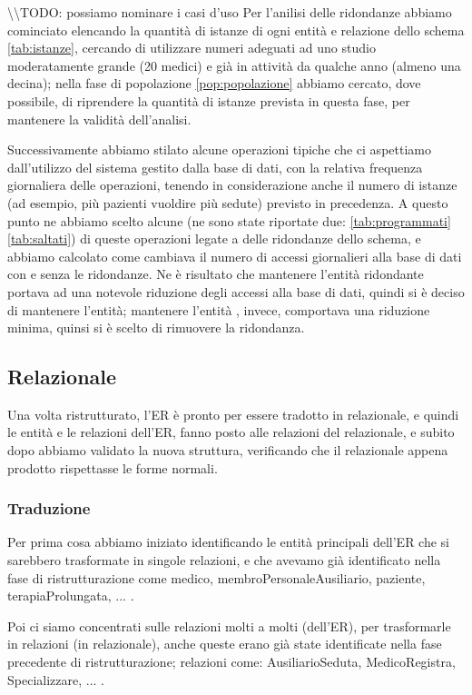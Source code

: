 \documentclass[11pt]{article}
\begin{document}
\textbackslash\textbackslash TODO: possiamo nominare i casi d'uso
Per l'anilisi delle ridondanze abbiamo cominciato elencando la quantità di istanze di ogni entità e relazione dello schema \ref{tab:istanze}, cercando di utilizzare numeri adeguati ad uno studio moderatamente grande (20 medici) e già in attività da qualche anno (almeno una decina); nella fase di popolazione \ref{pop:popolazione} abbiamo cercato, dove possibile, di riprendere la quantità di istanze prevista in questa fase, per mantenere la validità dell'analisi.

Successivamente abbiamo stilato alcune operazioni tipiche che ci aspettiamo dall'utilizzo del sistema gestito dalla base di dati, con la relativa frequenza giornaliera delle operazioni, tenendo in considerazione anche il numero di istanze (ad esempio, più pazienti vuoldire più sedute) previsto in precedenza. A questo punto ne abbiamo scelto alcune (ne sono state riportate due: \ref{tab:programmati} \ref{tab:saltati}) di queste operazioni legate a delle ridondanze dello schema, e abbiamo calcolato come cambiava il numero di accessi giornalieri alla base di dati con e senza le ridondanze. Ne è risultato che mantenere l'entità ridondante  portava ad una notevole riduzione degli accessi alla base di dati, quindi si è deciso di mantenere l'entità; mantenere l'entità , invece, comportava una riduzione minima, quinsi si è scelto di rimuovere la ridondanza.

\subsection{Relazionale}
Una volta ristrutturato, l'ER è pronto per essere tradotto in relazionale, e quindi le entità e le relazioni dell'ER, fanno posto alle relazioni del relazionale, e subito dopo abbiamo 
validato la nuova struttura, verificando che il relazionale appena prodotto rispettasse le forme normali.
\subsubsection{Traduzione}

Per prima cosa abbiamo iniziato identificando le entità principali dell'ER che si sarebbero trasformate in singole relazioni, e che avevamo già identificato nella fase di ristrutturazione come medico, membroPersonaleAusiliario, paziente, terapiaProlungata, ... .

Poi ci siamo concentrati sulle relazioni molti a molti (dell'ER), per trasformarle in relazioni (in relazionale), anche queste erano già state identificate nella fase precedente di ristrutturazione; relazioni come: AusiliarioSeduta, MedicoRegistra, Specializzare, ... .
\end{document}
